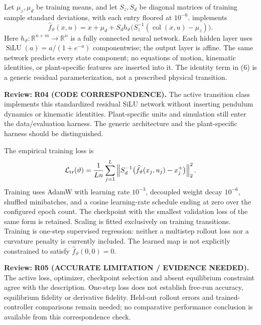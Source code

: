 \documentclass[11pt]{article}
\newcommand{\col}{\operatorname{col}}
\newcommand{\review}[1]{\par\noindent\textcolor{red!70!black}{\textbf{Review:} #1}\par}
\newcommand{\code}[1]{\texttt{\detokenize{#1}}}
\begin{document}
Let $\mu_z,\mu_d$ be training means, and let $S_z,S_d$ be diagonal matrices of training sample standard deviations, with each entry floored at $10^{-6}$. \code{DataDrivenTransition} implements
\begin{equation}\label{eq:transition}
\widehat f_\vartheta(x,u)=x+\mu_d+S_d h_\vartheta\bigl(S_z^{-1}(\col(x,u)-\mu_z)\bigr).
\end{equation}
Here $h_\vartheta:\mathbb R^{n+m}\to\mathbb R^n$ is a fully connected neural network. Each hidden layer uses $\operatorname{SiLU}(a)=a/(1+e^{-a})$ componentwise; the output layer is affine. The same network predicts every state component; no equations of motion, kinematic identities, or plant-specific features are inserted into it. The identity term in (6) is a generic residual parameterization, not a prescribed physical transition.
\review{\textbf{R04 (CODE CORRESPONDENCE).} The active transition class implements this standardized residual SiLU network without inserting pendulum dynamics or kinematic identities. Plant-specific units and simulation still enter the data/evaluation harness. The generic architecture and the plant-specific harness should be distinguished.}


The empirical training loss is
\begin{equation}\label{eq:loss}
\mathcal L_{\rm tr}(\vartheta)=\frac1{Ln}\sum_{j=1}^L\left\|S_d^{-1}\bigl(\widehat f_\vartheta(x_j,u_j)-x_j^+\bigr)\right\|_2^2.
\end{equation}
Training uses AdamW with learning rate $10^{-3}$, decoupled weight decay $10^{-6}$, shuffled minibatches, and a cosine learning-rate schedule ending at zero over the configured epoch count. The checkpoint with the smallest validation loss of the same form is retained. Scaling is fitted exclusively on training transitions. Training is one-step supervised regression: neither a multistep rollout loss nor a curvature penalty is currently included. The learned map is not explicitly constrained to satisfy $\widehat f_\vartheta(0,0)=0$.
\review{\textbf{R05 (ACCURATE LIMITATION / EVIDENCE NEEDED).} The active loss, optimizer, checkpoint selection and absent equilibrium constraint agree with the description. One-step loss does not establish free-run accuracy, equilibrium fidelity or derivative fidelity. Held-out rollout errors and trained-controller comparisons remain needed; no comparative performance conclusion is available from this correspondence check.}
\end{document}
